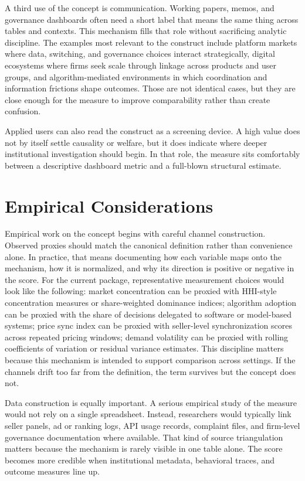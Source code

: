 \documentclass[12pt]{article}
\begin{document}
A third use of the concept is communication. Working papers, memos, and governance dashboards often need a short label that means the same thing across tables and contexts. This mechanism fills that role without sacrificing analytic discipline. The examples most relevant to the construct include platform markets where data, switching, and governance choices interact strategically, digital ecosystems where firms seek scale through linkage across products and user groups, and algorithm-mediated environments in which coordination and information frictions shape outcomes. Those are not identical cases, but they are close enough for the measure to improve comparability rather than create confusion.

Applied users can also read the construct as a screening device. A high value does not by itself settle causality or welfare, but it does indicate where deeper institutional investigation should begin. In that role, the measure sits comfortably between a descriptive dashboard metric and a full-blown structural estimate.

\section{Empirical Considerations}
Empirical work on the concept begins with careful channel construction. Observed proxies should match the canonical definition rather than convenience alone. In practice, that means documenting how each variable maps onto the mechanism, how it is normalized, and why its direction is positive or negative in the score. For the current package, representative measurement choices would look like the following: market concentration can be proxied with HHI-style concentration measures or share-weighted dominance indices; algorithm adoption can be proxied with the share of decisions delegated to software or model-based systems; price sync index can be proxied with seller-level synchronization scores across repeated pricing windows; demand volatility can be proxied with rolling coefficients of variation or residual variance estimates. This discipline matters because this mechanism is intended to support comparison across settings. If the channels drift too far from the definition, the term survives but the concept does not.

Data construction is equally important. A serious empirical study of the measure would not rely on a single spreadsheet. Instead, researchers would typically link seller panels, ad or ranking logs, API usage records, complaint files, and firm-level governance documentation where available. That kind of source triangulation matters because the mechanism is rarely visible in one table alone. The score becomes more credible when institutional metadata, behavioral traces, and outcome measures line up.
\end{document}
